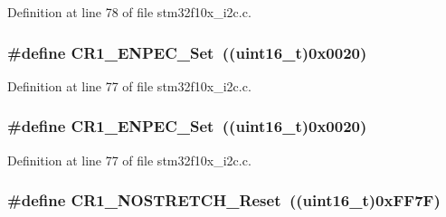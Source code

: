 Definition at line 78 of file stm32f10x\+\_\+i2c.\+c.

\subsubsection[{\texorpdfstring{C\+R1\+\_\+\+E\+N\+P\+E\+C\+\_\+\+Set}{CR1_ENPEC_Set}}]{\setlength{\rightskip}{0pt plus 5cm}\#define C\+R1\+\_\+\+E\+N\+P\+E\+C\+\_\+\+Set~(({\bf uint16\+\_\+t})0x0020)}\hypertarget{group___i2_c___private___defines_ga7fdf69341e5debc3244812012ae332e6}{}\label{group___i2_c___private___defines_ga7fdf69341e5debc3244812012ae332e6}


Definition at line 77 of file stm32f10x\+\_\+i2c.\+c.

\subsubsection[{\texorpdfstring{C\+R1\+\_\+\+E\+N\+P\+E\+C\+\_\+\+Set}{CR1_ENPEC_Set}}]{\setlength{\rightskip}{0pt plus 5cm}\#define C\+R1\+\_\+\+E\+N\+P\+E\+C\+\_\+\+Set~(({\bf uint16\+\_\+t})0x0020)}\hypertarget{group___i2_c___private___defines_ga7fdf69341e5debc3244812012ae332e6}{}\label{group___i2_c___private___defines_ga7fdf69341e5debc3244812012ae332e6}


Definition at line 77 of file stm32f10x\+\_\+i2c.\+c.

\subsubsection[{\texorpdfstring{C\+R1\+\_\+\+N\+O\+S\+T\+R\+E\+T\+C\+H\+\_\+\+Reset}{CR1_NOSTRETCH_Reset}}]{\setlength{\rightskip}{0pt plus 5cm}\#define C\+R1\+\_\+\+N\+O\+S\+T\+R\+E\+T\+C\+H\+\_\+\+Reset~(({\bf uint16\+\_\+t})0x\+F\+F7\+F)}\hypertarget{group___i2_c___private___defines_ga9a1609fd4bbcc38fc6423836730c8fa0}{}\label{group___i2_c___private___defines_ga9a1609fd4bbcc38fc6423836730c8fa0}


